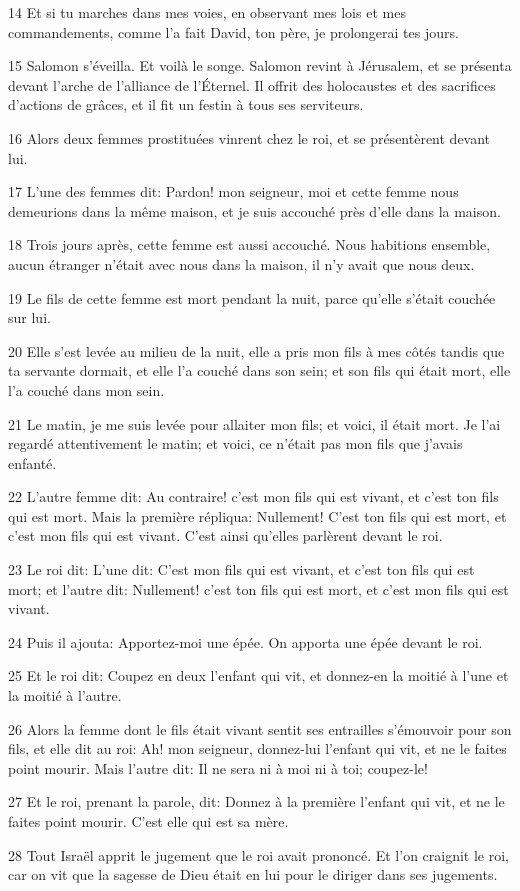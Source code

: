\par 14 Et si tu marches dans mes voies, en observant mes lois et mes commandements, comme l'a fait David, ton père, je prolongerai tes jours.
\par 15 Salomon s'éveilla. Et voilà le songe. Salomon revint à Jérusalem, et se présenta devant l'arche de l'alliance de l'Éternel. Il offrit des holocaustes et des sacrifices d'actions de grâces, et il fit un festin à tous ses serviteurs.
\par 16 Alors deux femmes prostituées vinrent chez le roi, et se présentèrent devant lui.
\par 17 L'une des femmes dit: Pardon! mon seigneur, moi et cette femme nous demeurions dans la même maison, et je suis accouché près d'elle dans la maison.
\par 18 Trois jours après, cette femme est aussi accouché. Nous habitions ensemble, aucun étranger n'était avec nous dans la maison, il n'y avait que nous deux.
\par 19 Le fils de cette femme est mort pendant la nuit, parce qu'elle s'était couchée sur lui.
\par 20 Elle s'est levée au milieu de la nuit, elle a pris mon fils à mes côtés tandis que ta servante dormait, et elle l'a couché dans son sein; et son fils qui était mort, elle l'a couché dans mon sein.
\par 21 Le matin, je me suis levée pour allaiter mon fils; et voici, il était mort. Je l'ai regardé attentivement le matin; et voici, ce n'était pas mon fils que j'avais enfanté.
\par 22 L'autre femme dit: Au contraire! c'est mon fils qui est vivant, et c'est ton fils qui est mort. Mais la première répliqua: Nullement! C'est ton fils qui est mort, et c'est mon fils qui est vivant. C'est ainsi qu'elles parlèrent devant le roi.
\par 23 Le roi dit: L'une dit: C'est mon fils qui est vivant, et c'est ton fils qui est mort; et l'autre dit: Nullement! c'est ton fils qui est mort, et c'est mon fils qui est vivant.
\par 24 Puis il ajouta: Apportez-moi une épée. On apporta une épée devant le roi.
\par 25 Et le roi dit: Coupez en deux l'enfant qui vit, et donnez-en la moitié à l'une et la moitié à l'autre.
\par 26 Alors la femme dont le fils était vivant sentit ses entrailles s'émouvoir pour son fils, et elle dit au roi: Ah! mon seigneur, donnez-lui l'enfant qui vit, et ne le faites point mourir. Mais l'autre dit: Il ne sera ni à moi ni à toi; coupez-le!
\par 27 Et le roi, prenant la parole, dit: Donnez à la première l'enfant qui vit, et ne le faites point mourir. C'est elle qui est sa mère.
\par 28 Tout Israël apprit le jugement que le roi avait prononcé. Et l'on craignit le roi, car on vit que la sagesse de Dieu était en lui pour le diriger dans ses jugements.

